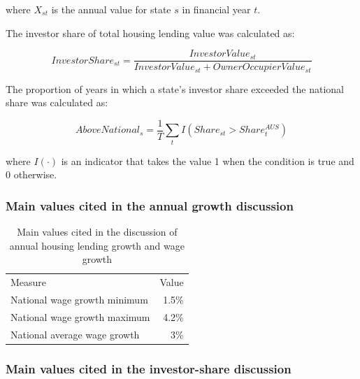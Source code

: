 \documentclass[
  11pt,
  a4paper,
]{article}
\begin{document}
where \(X_{st}\) is the annual value for state \(s\) in financial year
\(t\).

The investor share of total housing lending value was calculated as:

\[
InvestorShare_{st} = \frac{InvestorValue_{st}}{InvestorValue_{st} + OwnerOccupierValue_{st}}
\]

The proportion of years in which a state's investor share exceeded the
national share was calculated as:

\[
AboveNational_s = \frac{1}{T}\sum_t I\left(Share_{st} > Share^{AUS}_t\right)
\]

where \(I(\cdot)\) is an indicator that takes the value 1 when the
condition is true and 0 otherwise.

\subsubsection{Main values cited in the annual growth
discussion}\label{main-values-cited-in-the-annual-growth-discussion}

\begin{longtable}[t]{lr}

\caption{\label{tbl-app-q1-growth-values}Main values cited in the
discussion of annual housing lending growth and wage growth}

\tabularnewline

\\
\toprule
Measure & Value\\
\midrule
National wage growth minimum & 1.5\%\\
National wage growth maximum & 4.2\%\\
National average wage growth & 3\%\\
\bottomrule

\end{longtable}

\subsubsection{Main values cited in the investor-share
discussion}\label{main-values-cited-in-the-investor-share-discussion}
\end{document}
